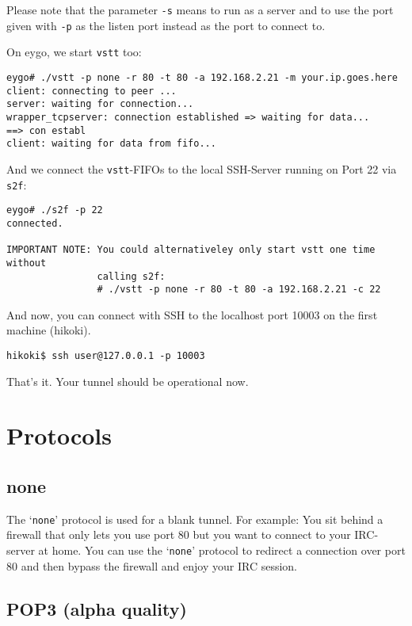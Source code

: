 \documentclass[10pt,a4paper]{article}
\begin{document}
Please note that the parameter \texttt{-s} means to run as a server and to use the port
given with \texttt{-p} as the listen port instead as the port to connect to.

On eygo, we start \texttt{vstt} too:

\begin{verbatim}
eygo# ./vstt -p none -r 80 -t 80 -a 192.168.2.21 -m your.ip.goes.here
client: connecting to peer ...
server: waiting for connection...
wrapper_tcpserver: connection established => waiting for data...
==> con establ
client: waiting for data from fifo...
\end{verbatim}

And we connect the \texttt{vstt}-FIFOs to the local SSH-Server running on Port 22
via \texttt{s2f}:

\begin{verbatim}
eygo# ./s2f -p 22
connected.

IMPORTANT NOTE: You could alternativeley only start vstt one time without
                calling s2f:
                # ./vstt -p none -r 80 -t 80 -a 192.168.2.21 -c 22
\end{verbatim}

And now, you can connect with SSH to the localhost port 10003 on the first
machine (hikoki).

\begin{verbatim}
hikoki$ ssh user@127.0.0.1 -p 10003
\end{verbatim}

That's it. Your tunnel should be operational now.

\section{Protocols}

\subsection{none}

The `\texttt{none}' protocol is used for a blank tunnel. For example: You sit behind a
firewall that only lets you use port 80 but you want to connect to your
IRC-server at home. You can use the `\texttt{none}' protocol to redirect a connection
over port 80 and then bypass the firewall and enjoy your IRC session.

\subsection{POP3 (alpha quality)}
\end{document}
